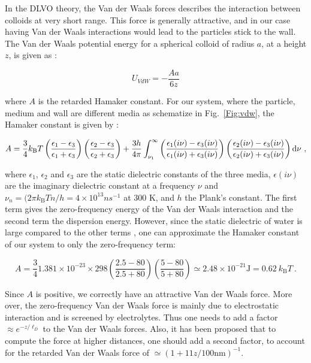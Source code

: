 In the DLVO theory, the Van der Waals forces describes the interaction between colloids at very short range. This force is generally attractive, and in our case having Van der Waals interactions would lead to the particles stick to the wall. The Van der Waals potential energy for a spherical colloid of radius $a$, at a height $z$, is given as \cite{israelachvili_intermolecular_2015}:

\begin{equation}
	U_{VdW} = -\frac{A a}{6z} 
\end{equation}

where $A$ is the retarded Hamaker constant. For our system, where the particle, medium and wall are different media as schematize in Fig.~\ref{Fig:vdw}, the Hamaker constant is given by \cite{israelachvili_intermolecular_2015}:

\begin{equation}
	A = \frac{3}{4} k_\mathrm{B}T \left(
	\frac{\epsilon_1 - \epsilon_3}{\epsilon_1 + \epsilon_3}
	\right)
	\left(
	\frac{\epsilon_2 - \epsilon_3}{\epsilon_2 + \epsilon_3}
	\right)
	+
	\frac{3h}{4\pi}
	\int_{\nu_1}^{\infty}
	\left(
	\frac{\epsilon_1 (i\nu) - \epsilon_3 (i\nu)}{\epsilon_1 (i\nu) + \epsilon_3 (i\nu)}
	\right)
	\left(
	\frac{\epsilon_2 (i\nu) - \epsilon_3 (i\nu)}{\epsilon_2 (i\nu) + \epsilon_3 (i\nu)}
	\right)
	\textnormal{d}\nu ~,
\end{equation}

where $\epsilon_1$, $\epsilon_2$ and $\epsilon_3$ are the static dielectric constants of the three media, $\epsilon (i\nu)$ are the imaginary dielectric constant at a frequency $\nu$ and $\nu_n = (2 \pi k_\mathrm{B}Tn/h = 4 \times 10^{13} n s^{-1}$ at $300$ K, and $h$ the Plank's constant. The first term gives the zero-frequency energy of the Van der Waals interaction and the second term the dispersion energy.
However, since the static dielectric of water is large compared to the other terms \cite{israelachvili_intermolecular_2015}, one can approximate the Hamaker constant of our system to only the zero-frequency term:

\begin{equation}
	A = \frac{3}{4} 1.381 \times 10^{-23} \times 298 
	\left(
	\frac{2.5 - 80}{2.5 + 80}
	\right)
	\left(
	\frac{5 - 80}{5 + 80}
	\right)
	\simeq
	2.48 \times 10^{-21} \mathrm{J} = 0.62 ~ k_\mathrm{B}T ~.
\end{equation}

Since $A$ is positive, we correctly have an attractive Van der Waals force. More over, the zero-frequency Van der Waals force is mainly due to electrostatic interaction and is screened by electrolytes. Thus one needs to add a factor $\approx e^{-z/\ell_D}$ to the Van der Waals forces. Also, it has been proposed \cite{gregory_approximate_1981} that to compute the force at higher distances, one should add a second factor, to account for the retarded Van der Waals force of $ \simeq (1  + 11z/100 \mathrm{nm})^{-1}$. 


